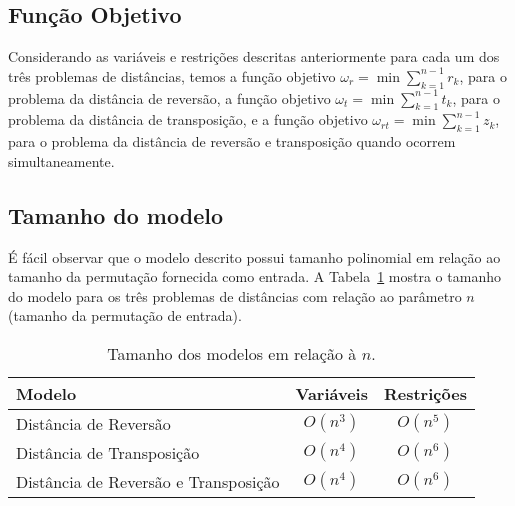 \subsection{Função Objetivo}
\label{subsec:fo}
Considerando as variáveis e restrições descritas anteriormente para
cada um dos três problemas de distâncias, temos a função objetivo
$\omega_{r} = \min \sum_{k=1}^{n-1} r_{k}$, para o problema da
distância de reversão, a função objetivo $\omega_{t}
= \min \sum_{k=1}^{n-1} t_{k}$, para o problema da distância de
transposição, e a função objetivo $\omega_{rt} = \min \sum_{k=1}^{n-1}
z_{k}$, para o problema da distância de reversão e transposição quando
ocorrem simultaneamente.

\subsection{Tamanho do modelo}
\label{subsec:modelsize}
É fácil observar que o modelo descrito possui tamanho polinomial em
relação ao tamanho da permutação fornecida como entrada. A
Tabela~\ref{table:modelsize} mostra o tamanho do modelo para os três
problemas de distâncias com relação ao parâmetro $n$ (tamanho da
permutação de entrada).

\begin{table}[h]
\caption{Tamanho dos modelos em relação à $n$.}
\label{table:modelsize}
\center
\begin{tabular}{|l|c|c|}
  \hline
  \textbf{Modelo} & \textbf{Variáveis} & \textbf{Restrições} \\
  \hline
  Distância de Reversão & $O(n^3)$ & $O(n^5)$ \\
  Distância de Transposição & $O(n^4)$ & $O(n^6)$ \\
  Distância de Reversão e Transposição & $O(n^4)$ & $O(n^6)$ \\
  \hline
\end{tabular}
\end{table}
